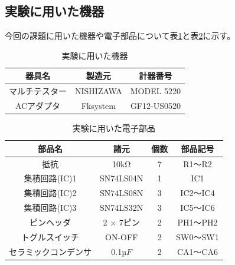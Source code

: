 \documentclass[a4paper,11pt,dvipdfmx]{jsarticle}
\begin{document}
\subsection{実験に用いた機器}
今回の課題に用いた機器や電子部品について表\ref{tab:equipment}と表\ref{tab:electronicParts}に示す。

\begin{table}[H]
  \caption{実験に用いた機器}
  \centering
  \begin{tabular}{c|c|c}
    \hline
    器具名         & 製造元    & 計器番号    \\
    \hline \hline
    マルチテスター & NISHIZAWA & MODEL 5220  \\
    \hline
    ACアダプタ     & Fksystem  & GF12-US0520 \\
    \hline
  \end{tabular}
  \label{tab:equipment}
\end{table}

\begin{table}[H]
  \caption{実験に用いた電子部品}
  \centering
  \begin{tabular}{c|c|c|c}
    \hline
    部品名               & 諸元          & 個数 & 部品記号 \\
    \hline \hline
    抵抗                 & 10kΩ   & 7    & R1～R2   \\
    \hline
    集積回路(IC)1        & SN74LS04N     & 1    & IC1      \\
    \hline
    集積回路(IC)2        & SN74LS08N     & 3    & IC2～IC4 \\
    \hline
    集積回路(IC)3        & SN74LS32N     & 3    & IC5～IC6 \\
    \hline
    ピンヘッダ           & 2 × 7ピン & 2    & PH1～PH2 \\
    \hline
    トグルスイッチ       & ON-OFF        & 2    & SW0～SW1 \\
    \hline
    セラミックコンデンサ & 0.1µ$F$       & 2    & CA1～CA6 \\
    \hline
  \end{tabular}
  \label{tab:electronicParts}
\end{table}
\end{document}
